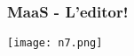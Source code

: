 \begin{frame}
  \frametitle{MaaS - L'editor!}
  \centering
  \texttt{[image: n7.png]}
\end{frame}


